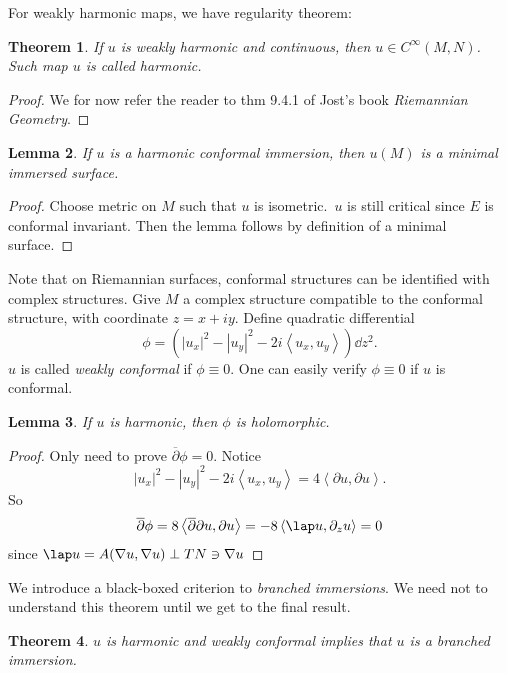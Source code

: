 \documentclass[UTF8,12pt]{article}
\theoremstyle{plain}\newtheorem{theorem}{Theorem}
\theoremstyle{definition}\newtheorem{definition}[theorem]{Definition}
\theoremstyle{definition}\newtheorem{example}[theorem]{Example}
\theoremstyle{plain}\newtheorem{axiom}[theorem]{Axiom}
\theoremstyle{plain}\newtheorem{assertion}[theorem]{Assertion}
\theoremstyle{plain}\newtheorem{corollary}[theorem]{Corollary}
\theoremstyle{plain}\newtheorem{lemma}[theorem]{Lemma}
\theoremstyle{plain}\newtheorem{proposition}[theorem]{Proposition}
\theoremstyle{plain}\newtheorem{prop}[theorem]{Proposition}
\theoremstyle{plain}\newtheorem{conjecture}[theorem]{Conjecture}
\theoremstyle{plain}\newtheorem{conj}[theorem]{Conjecture}
\theoremstyle{plain}\newtheorem{problem}[theorem]{Problem}
\theoremstyle{remark}\newtheorem{notation}[theorem]{Notation}
\theoremstyle{definition}\newtheorem*{question}{Question}
\theoremstyle{definition}\newtheorem*{answer}{Answer}
\theoremstyle{definition}\newtheorem*{goal}{Goal}
\theoremstyle{plain}\newtheorem*{application}{Application}
\theoremstyle{plain}\newtheorem*{exercise}{Exercise}
\theoremstyle{remark}\newtheorem*{remark}{Remark}
\theoremstyle{remark}\newtheorem*{note}{\small{Note}}
\numberwithin{equation}{section}
\numberwithin{theorem}{section}
\numberwithin{figure}{section}
\begin{document}
For weakly harmonic maps, we have regularity theorem:
\begin{theorem}
    If \(u\) is weakly harmonic and continuous, then \(u\in C^\infty(M,N)\). Such map
    \(u\) is called harmonic.
\end{theorem}
\begin{proof}
    We for now refer the reader to thm 9.4.1 of Jost's book \emph{Riemannian
    Geometry}.
\end{proof}

\begin{lemma}
    If \(u\) is a harmonic conformal immersion, then \(u(M)\) is a minimal
    immersed surface.
\end{lemma}
\begin{proof}
    Choose metric on \(M\) such that \(u\) is isometric.\ \(u\) is still critical since
    \(E\) is conformal invariant. Then the lemma follows by definition of a minimal 
    surface.
\end{proof}

Note that on Riemannian surfaces, conformal structures can be identified with complex
structures. Give \(M\) a complex structure compatible to the conformal structure,
with coordinate \(z=x+iy\). Define quadratic differential
\begin{equation}\label{eq:quad-diff}
    \phi=\left(|u_x|^2-|u_y|^2-2i\left<u_x,u_y\right> \right)\dd{z}^2
.\end{equation}
\(u\) is called \emph{weakly conformal} if \(\phi\equiv 0\). One can easily verify
\(\phi\equiv 0\) if \(u\) is conformal.
\begin{lemma}
    If \(u\) is harmonic, then \(\phi\) is holomorphic.
\end{lemma}
\begin{proof}
    Only need to prove \(\overline{\partial}\phi=0\). Notice \[
        |u_x|^2-|u_y|^2-2i\left<u_x,u_y\right> =4\left<\partial u,\partial u\right> 
    .\] So \[
        \overline{\partial}\phi=8\left<\overline{\partial}\partial u,\partial u\right> 
        =-8\left<\lap u,\partial_z u\right> =0
    \] since \(\lap u=A(\nabla u,\nabla u)\perp TN\ni \nabla u\)
\end{proof}

We introduce a black-boxed criterion to \emph{branched immersions}. We need not to
understand this theorem until we get to the final result.
\begin{theorem}
    \(u\) is harmonic and weakly conformal implies that \(u\) is a branched immersion.
\end{theorem}
\end{document}
